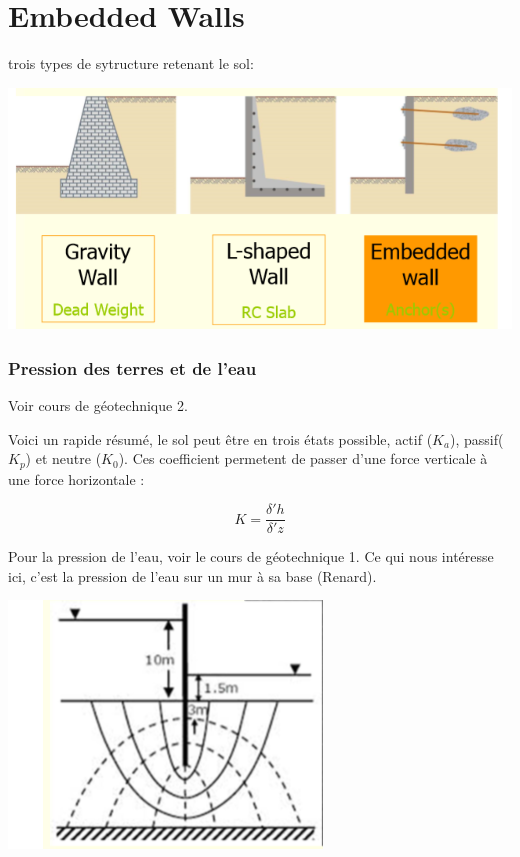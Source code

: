 \part{Embedded Walls}

trois types de sytructure retenant le sol:
\begin{center}
\includegraphics [scale=0.5]{pictures/1.PNG}
\end{center}

\section{Pression des terres et de l'eau}

Voir cours de géotechnique 2.

Voici un rapide résumé, le sol peut être en trois états possible, actif ($K_a$), passif($K_p$) et neutre ($K_0$). Ces coefficient permetent de passer d'une force verticale à une force horizontale :

$$ K = \frac{\delta'h}{\delta'z}$$

Pour la pression de l'eau, voir le cours de géotechnique 1. Ce qui nous intéresse ici, c'est la pression de l'eau sur un mur à sa base (Renard).

\begin{center}
\includegraphics [scale=0.5]{pictures/2.PNG}
\end{center}

